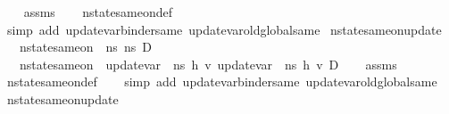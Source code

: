 \begin{isabellebody}
%
\isadelimproof
\ \ %
\endisadelimproof
%
\isatagproof
{}\isamarkupfalse%
\ assms\isanewline
\ \ \isamarkupfalse%
\ nstate{\isacharunderscore}{\kern0pt}same{\isacharunderscore}{\kern0pt}on{\isacharunderscore}{\kern0pt}def\isanewline
\ \ \isamarkupfalse%
\ {\isacharparenleft}{\kern0pt}simp\ add{\isacharcolon}{\kern0pt}\ update{\isacharunderscore}{\kern0pt}var{\isacharunderscore}{\kern0pt}binder{\isacharunderscore}{\kern0pt}same\ update{\isacharunderscore}{\kern0pt}var{\isacharunderscore}{\kern0pt}old{\isacharunderscore}{\kern0pt}global{\isacharunderscore}{\kern0pt}same{\isacharparenright}{\kern0pt}%
\endisatagproof
{\isafoldproof}%
%
\isadelimproof
\isanewline
%
\endisadelimproof
\isanewline
{}\isamarkupfalse%
\ nstate{\isacharunderscore}{\kern0pt}same{\isacharunderscore}{\kern0pt}on{\isacharunderscore}{\kern0pt}update{\isacharunderscore}{\kern0pt}{}{\isacharcolon}{\kern0pt}\isanewline
\ \ \ {\isachardoublequoteopen}nstate{\isacharunderscore}{\kern0pt}same{\isacharunderscore}{\kern0pt}on\ {\isasymLambda}\ ns{}\ ns{}\ D{\isachardoublequoteclose}\isanewline
\ \ \ {\isachardoublequoteopen}nstate{\isacharunderscore}{\kern0pt}same{\isacharunderscore}{\kern0pt}on\ {\isasymLambda}\ {\isacharparenleft}{\kern0pt}update{\isacharunderscore}{\kern0pt}var\ {\isasymLambda}\ ns{}\ h\ v{\isacharparenright}{\kern0pt}\ {\isacharparenleft}{\kern0pt}update{\isacharunderscore}{\kern0pt}var\ {\isasymLambda}\ ns{}\ h\ v{\isacharparenright}{\kern0pt}\ D{\isachardoublequoteclose}\isanewline
%
\isadelimproof
\ \ %
\endisadelimproof
%
\isatagproof
{}\isamarkupfalse%
\ assms\isanewline
\ \ \isamarkupfalse%
\ nstate{\isacharunderscore}{\kern0pt}same{\isacharunderscore}{\kern0pt}on{\isacharunderscore}{\kern0pt}def\isanewline
\ \ \isamarkupfalse%
\ {\isacharparenleft}{\kern0pt}simp\ add{\isacharcolon}{\kern0pt}\ update{\isacharunderscore}{\kern0pt}var{\isacharunderscore}{\kern0pt}binder{\isacharunderscore}{\kern0pt}same\ update{\isacharunderscore}{\kern0pt}var{\isacharunderscore}{\kern0pt}old{\isacharunderscore}{\kern0pt}global{\isacharunderscore}{\kern0pt}same{\isacharparenright}{\kern0pt}%
\endisatagproof
{\isafoldproof}%
%
\isadelimproof
\isanewline
%
\endisadelimproof
\isanewline
{}\isamarkupfalse%
\ nstate{\isacharunderscore}{\kern0pt}same{\isacharunderscore}{\kern0pt}on{\isacharunderscore}{\kern0pt}update{\isacharunderscore}{\kern0pt}{}{\isacharcolon}{\kern0pt}\isanewline

\end{isabellebody}
